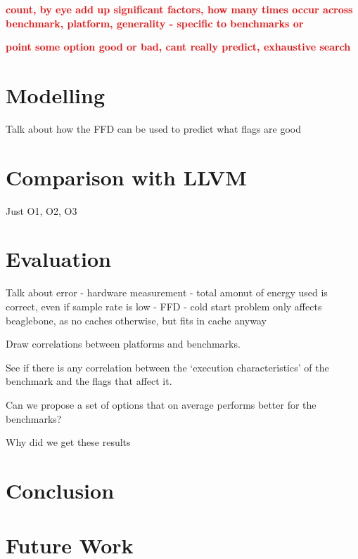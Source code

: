 \documentclass[twocolumn]{article}
\newcommand{\todo}[1]{\textbf{\textcolor{red}{#1}}}
\begin{document}
\todo{count, by eye add up significant factors, how many times occur across benchmark, platform, generality - specific to benchmarks or}

\todo{point some option good or bad, cant really predict, exhaustive search}

\section*{Modelling}

Talk about how the FFD can be used to predict what flags are good

\section*{Comparison with LLVM}

Just O1, O2, O3


\section*{Evaluation}

Talk about error
 - hardware measurement
 - total amonut of energy used is correct, even if sample rate is low
 - FFD
 - cold start problem
 	only affects beaglebone, as no caches otherwise, but fits in cache anyway


Draw correlations between platforms and benchmarks.

See if there is any correlation between the `execution characteristics' of the benchmark and the flags that affect it.

Can we propose a set of options that on average performs better for the benchmarks?

Why did we get these results


\section*{Conclusion}

\section*{Future Work}

\printbibliography
\end{document}
